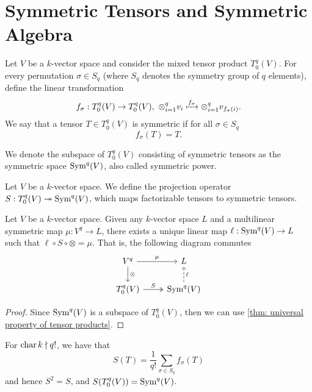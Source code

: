 \section{Symmetric Tensors and Symmetric Algebra}

\begin{definition}
Let \(V\) be a \(k\)-vector space and consider the mixed tensor product
\(T_0^q(V)\). For every permutation \(\sigma \in S_q\) (where
\(S_q\) denotes the symmetry group of \(q\) elements), define the
linear transformation
\[
  f_\sigma: T_0^q(V) \to T_0^q(V),\ \otimes_{i=1}^q v_i \xmapsto{f_\sigma}
  \otimes_{i=1}^q v_{f_\sigma(i)}.
\]
We say that a tensor \(T \in T_0^q(V)\) is symmetric if for all \(\sigma \in S_q\)
\[
    f_\sigma(T) = T.
\]
\end{definition}

\begin{definition}
We denote the subspace of \(T_0^q(V)\) consisting of symmetric tensors as the
symmetric space \(\operatorname{Sym}^q(V)\), also called symmetric power.
\end{definition}

\begin{definition}
Let \(V\) be a \(k\)-vector space. We define the projection operator \(S:
T_0^q(V) \twoheadrightarrow \operatorname{Sym}^q(V)\), which maps factorizable tensors to symmetric tensors.
\end{definition}

\begin{proposition}
Let \(V\) be a \(k\)-vector space. Given any \(k\)-vector space \(L\) and a
multilinear symmetric map \(\mu: V^q \to L\), there exists a unique linear map
\(\ell: \operatorname{Sym}^q(V) \to L\) such that \(\ell \circ S \circ \otimes = \mu\). That
is, the following diagram commutes
\[
  \begin{tikzcd}
    V^q \ar[r, "\mu"] \ar[d, "\otimes"] &L \\
    T_0^q(V) \ar[r, two heads, "S"] &\Sym^q(V) \ar[u, dashed, swap, "\ell"]
  \end{tikzcd}
\]
\end{proposition}

\begin{proof}
Since \(\operatorname{Sym}^q(V)\) is a subspace of \(T_0^q(V)\), then we can use
\cref{thm: universal property of tensor products}.
\end{proof}

\begin{proposition}
For \(\operatorname{char} k \nmid q!\), we have that
\[
  S(T) = \frac{1}{q!} \sum_{\sigma \in S_q} f_\sigma(T)
\]
and hence \(S^2 = S\), and \(S(T_0^q(V)) = \operatorname{Sym}^q(V)\).
\end{proposition}

